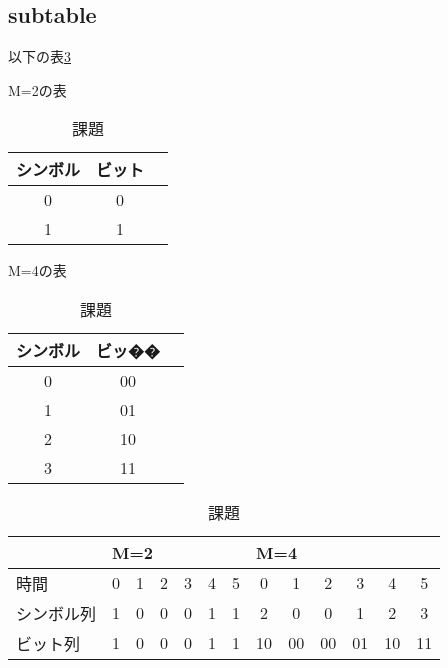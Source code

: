 \documentclass{jsarticle}           %
\theoremstyle{plain}
\theoremstyle{definition}
\theoremstyle{remark}
\begin{document}
\subsection{subtable}
以下の表\ref{課題1.2: 課題}
\begin{table}[H]
  \begin{subtable}{0.49\columnwidth}
    \begin{center}
      \caption[M=2]{M=2の表}
      \label{課題1.2: M=2の表}
      \setlength{\tabcolsep}{3pt}
      \footnotesize
      \begin{tabular}{|c|c|c}
        \hline
        シンボル & ビット \\ \hline \hline
        0            & 0         \\ \hline
        1            & 1         \\ \hline
      \end{tabular}
    \end{center}
  \end{subtable}
  \begin{subtable}{0.49\columnwidth}
    \begin{center}
      \caption[M=4]{M=4の表}
      \label{課題1.2: M=4の表}
      \setlength{\tabcolsep}{3pt}
      \footnotesize
      \begin{tabular}{|c|c|c}
        \hline
        シンボル & ビッ�� \\ \hline \hline
        0            & 00        \\ \hline
        1            & 01        \\ \hline
        2            & 10        \\ \hline
        3            & 11        \\ \hline
      \end{tabular}
    \end{center}
  \end{subtable}
  \begin{subtable}{\columnwidth}
    \begin{center}
      \caption[M]{課題}
      \label{課題1.2: 課題}
      \setlength{\tabcolsep}{3pt}
      \footnotesize
      \begin{tabular}{|l|c|c|c|c|c|c|c|c|c|c|c|c|}
        \hline
                                    
        & \multicolumn{6}{|l|}{M=2}
        & \multicolumn{6}{|l|}{M=4} \\ \hline
        時間 
          & 0  & 1  & 2  & 3  & 4  & 5  
          & 0  & 1  & 2  & 3  & 4  & 5  \\ \hline
        シンボル列
          & 1  & 0  & 0  & 0  & 1  & 1  
          & 2  & 0  & 0  & 1  & 2  & 3  \\ \hline
        ビット列
          & 1  & 0  & 0  & 0  & 1  & 1  
          & 10 & 00 & 00 & 01 & 10 & 11 \\ \hline
      \end{tabular}
    \end{center}
  \end{subtable}
\end{table}
            
\end{document}
